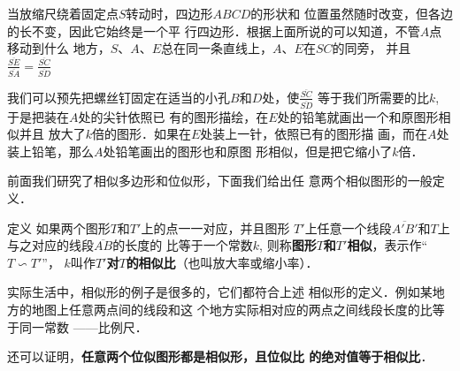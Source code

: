 当放缩尺绕着固定点$S$转动时，四边形$ABCD$的形状和
位置虽然随时改变，但各边的长不变，因此它始终是一个平
行四边形．根据上面所说的可以知道，不管$A$点移动到什么
地方，$S$、$A$、$E$总在同一条直线上，$A$、$E$在$SC$的同旁，
并且$\frac{\overline{SE}}{\overline{SA}}=\frac{\overline{SC}}{\overline{SD}}$

我们可以预先把螺丝钉固定在适当的小孔$B$和$D$处，使$\frac{\overline{SC}}{\overline{SD}}$
等于我们所需要的比$k$, 于是把装在$A$处的尖针依照已
有的图形描绘，在$E$处的铅笔就画出一个和原图形相似并且
放大了$k$倍的图形．如果在$E$处装上一针，依照已有的图形描
画，而在$A$处装上铅笔，那么$A$处铅笔画出的图形也和原图
形相似，但是把它缩小了$k$倍．

前面我们研究了相似多边形和位似形，下面我们给出任
意两个相似图形的一般定义．

\begin{blk}
    {定义}
如果两个图形$T$和$T'$上的点一一对应，并且图形
$T'$上任意一个线段$\overline{A'B'}$和$T$上与之对应的线段$\overline{AB}$的长度的
比等于一个常数$k$, 则称\textbf{图形$T$和$T'$相似}，表示作“$T\backsim T'$”，
$k$叫作\textbf{$T'$对$T$的相似比}（也叫放大率或缩小率）．
\end{blk}

实际生活中，相似形的例子是很多的，它们都符合上述
相似形的定义．例如某地方的地图上任意两点间的线段和这
个地方实际相对应的两点之间线段长度的比等于同一常数
——比例尺．

还可以证明，\textbf{任意两个位似图形都是相似形，且位似比
的绝对值等于相似比}．


